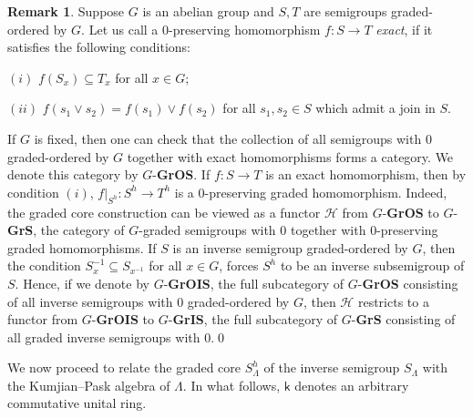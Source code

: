 \documentclass[a4paper,reqno,11pt]{amsart}
\numberwithin{equation}{section}
\theoremstyle{definition}
\newtheorem{rmk}[thm]{Remark}
\theoremstyle{remark}
\begin{document}
\begin{rmk}\label{rem the graded core functor}
Suppose $G$ is an abelian group and $S,T$ are semigroups graded-ordered by $G$. Let us call a $0$-preserving homomorphism $f:S\longrightarrow T$ \emph{exact}, if it satisfies the following conditions:

$(i)$ $f(S_x)\subseteq T_x$ for all $x\in G$;

$(ii)$ $f(s_1\vee s_2)=f(s_1)\vee f(s_2)$ for all $s_1,s_2\in S$ which admit a join in $S$.

If $G$ is fixed, then one can check that the collection of all semigroups with $0$ graded-ordered by $G$ together with exact homomorphisms forms a category. We denote this category by $G$-\textbf{GrOS}. If $f:S\longrightarrow T$ is an exact homomorphism, then by condition $(i)$, $f|_{S^h}:S^h\longrightarrow T^h$ is a $0$-preserving graded homomorphism. Indeed, the graded core construction can be viewed as a functor $\mathcal{H}$ from $G$-\textbf{GrOS} to $G$-\textbf{GrS}, the category of $G$-graded semigroups with $0$ together with $0$-preserving graded homomorphisms. If $S$ is an inverse semigroup graded-ordered by $G$, then the condition $S_x^{-1}\subseteq S_{x^{-1}}$ for all $x\in G$, forces $S^h$ to be an inverse subsemigroup of $S$. Hence, if we denote by $G$-\textbf{GrOIS}, the full subcategory of $G$-\textbf{GrOS} consisting of all inverse semigroups with $0$ graded-ordered by $G$, then $\mathcal{H}$ restricts to a functor from $G$-\textbf{GrOIS} to $G$-\textbf{GrIS}, the full subcategory of $G$-\textbf{GrS} consisting of all graded inverse semigroups with $0$.\qed
\end{rmk}

We now proceed to relate the graded core $S_\Lambda^h$ of the inverse semigroup $S_\Lambda$ with the Kumjian--Pask algebra of $\Lambda$. In what follows, $\mathsf{k}$ denotes an arbitrary commutative unital ring.
\end{document}
